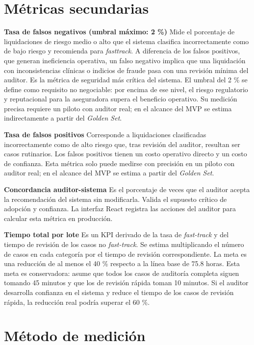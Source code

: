 \section{Métricas secundarias}

 \textbf{Tasa de falsos negativos (umbral máximo: 2 \%)} Mide el porcentaje de liquidaciones de riesgo medio o alto que el sistema clasifica incorrectamente como de bajo riesgo y recomienda para \textit{fasttrack}. A diferencia de los falsos positivos, que generan ineficiencia operativa, un falso negativo implica que una liquidación con inconsistencias clínicas o indicios de fraude pasa con una revisión mínima del auditor. Es la métrica de seguridad más crítica del sistema. El umbral del 2 \% se define como requisito no negociable: por encima de ese nivel, el riesgo regulatorio y reputacional para la aseguradora supera el beneficio operativo. Su medición precisa requiere un piloto con auditor real; en el alcance del MVP se estima indirectamente a partir del \textit{Golden Set}.

\textbf{Tasa de falsos positivos} Corresponde a liquidaciones clasificadas incorrectamente como de alto riesgo que, tras revisión del auditor, resultan ser casos rutinarios. Los falsos positivos tienen un costo operativo directo y un costo de confianza. Esta métrica solo puede medirse con precisión en un piloto con auditor real; en el alcance del MVP se estima a partir del \textit{Golden Set}.

\textbf{Concordancia auditor-sistema} Es el porcentaje de veces que el auditor acepta la recomendación del sistema sin modificarla. Valida el supuesto crítico de adopción y confianza. La interfaz React registra las acciones del auditor para calcular esta métrica en producción.

\textbf{Tiempo total por lote} Es un KPI derivado de la tasa de \textit{fast-track} y del tiempo de revisión de los casos no \textit{fast-track}. Se estima multiplicando el número de casos en cada categoría por el tiempo de revisión correspondiente. La meta es una reducción de al menos el 40 \% respecto a la línea base de 75.8 horas. Esta meta es conservadora: asume que todos los casos de auditoría completa siguen tomando 45 minutos y que los de revisión rápida toman 10 minutos. Si el auditor desarrolla confianza en el sistema y reduce el tiempo de los casos de revisión rápida, la reducción real podría superar el 60 \%.

\section{Método de medición}

